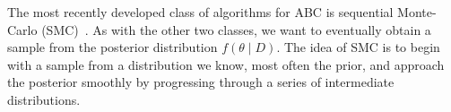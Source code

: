 The most recently developed class of algorithms for ABC is sequential
Monte-Carlo (SMC)~\autocite{sisson2007sequential}. As with the other two
classes, we want to eventually obtain a sample from the posterior distribution
$f(\theta \mid D)$. The idea of SMC is to begin with a sample from a
distribution we know, most often the prior, and approach the posterior smoothly
by progressing through a series of intermediate distributions.

